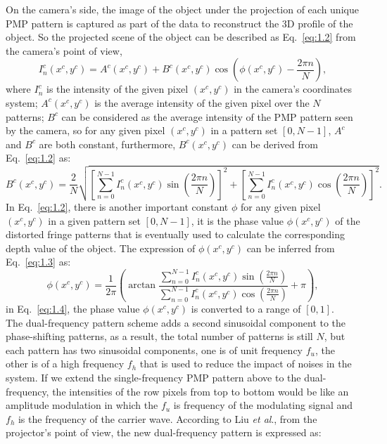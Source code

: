 \documentclass[]{spie}  %
\begin{document}
On the camera's side, the image of  the object under the projection of each unique PMP pattern is captured as part of the data to reconstruct the 3D profile of the object. So the projected scene of the object can be described as Eq.~\eqref{eq:1.2} from the camera's point of view, 
 \begin{equation} \label{eq:1.2}
  	I^c_n(x^c, y^c) =  A^c(x^c, y^c) + B^c(x^c, y^c)\cos\left(\phi(x^c, y^c) - \frac{2\pi n}{N}\right),
  \end{equation}
where $I^c_n$ is the intensity of the given pixel $(x^c, y^c)$ in the camera's coordinates system; $A^c(x^c, y^c)$ is the average intensity of the given pixel over the $N$ patterns; $B^c$ can be considered as the average intensity of the PMP pattern seen by the camera, so for any given pixel $(x^c, y^c)$ in a pattern set $[0, N-1]$, $A^c$ and $B^c$ are both constant, furthermore, $B^c(x^c, y^c)$ can be derived from Eq.~\eqref{eq:1.2} as:
  \begin{equation} \label{eq:1.3}
  	B^c(x^c, y^c) = \frac{2}{N}\sqrt{\left[\sum_{n=0}^{N-1}I_n^c(x^c, y^c)\sin (\frac{2\pi n}{N})\right]^2 + \left[\sum_{n=0}^{N-1}I_n^c(x^c, y^c)\cos (\frac{2\pi n}{N})\right]^2}.
  \end{equation}
In Eq.~\ref{eq:1.2}, there is another important constant $\phi$ for any given pixel $(x^c, y^c)$ in a given pattern set $[0, N-1]$, it is the phase value $\phi (x^c, y^c)$ of the distorted fringe patterns that is eventually used to calculate the corresponding depth value of the object. The expression of $\phi (x^c, y^c)$ can be inferred from Eq.~\eqref{eq:1.3} as:
  \begin{equation} \label{eq:1.4}
  	\phi (x^c, y^c) = \frac{1}{2\pi}\left(\arctan \frac{\sum_{n=0}^{N-1} I^c_n(x^c, y^c)\sin(\frac{2\pi n}{N})}{\sum_{n=0}^{N-1} I^c_n(x^c, y^c)\cos(\frac{2\pi n}{N})} + \pi\right),
  \end{equation}
in Eq.~\eqref{eq:1.4}, the phase value $\phi (x^c, y^c)$ is converted to a range of $[0, 1]$.\\
The dual-frequency pattern scheme adds a second sinusoidal component to the phase-shifting patterns, as a result, the total number of patterns is still $N$, but each pattern has two sinusoidal components, one is of unit frequency $f_u$, the other is of a high frequency $f_h$ that is used to reduce the impact of noises in the system. If we extend the single-frequency PMP pattern above to the dual-frequency, the intensities of the row pixels from top to bottom would be like an amplitude modulation in which the $f_u$ is frequency of the modulating signal and $f_h$ is the frequency of the carrier wave. According to Liu \textit{et al}., from the projector's point of view, the new dual-frequency pattern is expressed as:
\end{document}
